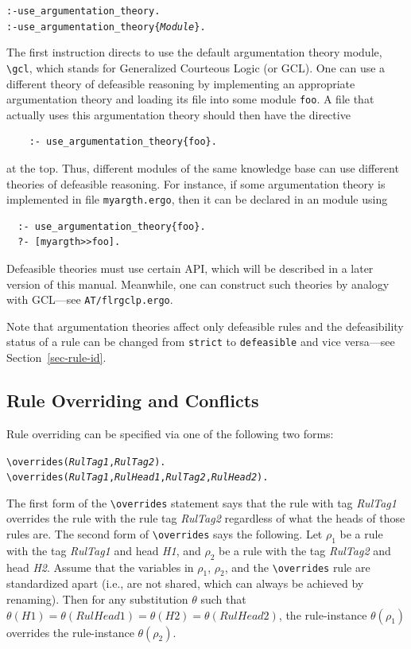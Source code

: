 \documentclass[11pt]{article}
\newcommand{\ERGO}{\mbox{\smaller{\ensuremath{\cal{E}}\smaller{{\sc{RGO}}}}}\xspace}
\newcommand{\FLSYSTEM}{\ERGO}
\newcommand{\ergoext}{ergo\xspace}
\newcommand{\bs}{\textbackslash}
\begin{document}
\begin{alltt}
  :- use_argumentation_theory.
  :- use_argumentation_theory\{\emph{Module}\}.
\end{alltt}
\index{\bs{}gcl module}
The first instruction directs \FLSYSTEM to use the default argumentation theory
module, {\tt \bs{}gcl}, which stands for Generalized Courteous Logic (or GCL).
One can use a different theory of defeasible reasoning by implementing an
appropriate argumentation theory and
loading its file into some module {\tt foo}.
A file that actually uses this argumentation theory should then have
the directive
\begin{verbatim}
    :- use_argumentation_theory{foo}.
\end{verbatim}
at the top. Thus, different modules of the same \FLSYSTEM
knowledge base can use different theories of defeasible reasoning.
For instance, if some argumentation theory is implemented in file
\texttt{myargth.\ergoext}, then it can be declared in an \FLSYSTEM module
using
\begin{verbatim}
  :- use_argumentation_theory{foo}.
  ?- [myargth>>foo].
\end{verbatim}

Defeasible theories must use certain API, which will
be described in a later version of this manual. Meanwhile, one can
construct such theories by analogy with GCL---see {\tt AT/flrgclp.\ergoext}.  

Note that argumentation theories affect only defeasible rules and the
defeasibility status of a rule can be changed from \texttt{strict} to
\texttt{defeasible} and vice versa---see
Section~\ref{sec-rule-id}.

\subsection{Rule Overriding and Conflicts}\label{sec-overriding-conflict}

Rule overriding can be specified via one of the following two forms:
\index{\bs{}overrides predicate}
\begin{alltt}
  \bs{}overrides({\em{}RulTag1},\emph{RulTag2}).
  \bs{}overrides({\em{}RulTag1},{\em{}RulHead1},{\em{}RulTag2},\emph{RulHead2}).
\end{alltt}
The first form of the {\tt \bs{}overrides} statement says that the rule with
tag \emph{RulTag1} overrides the rule with the rule tag
\emph{RulTag2} regardless of what the heads of those rules are. The second
form of {\tt \bs{}overrides} says the following. Let $\rho_1$ be a 
rule with the tag \emph{RulTag1} and head \emph{H1}, and $\rho_2$ be a
rule with the tag \emph{RulTag2} and head \emph{H2}. Assume that
the variables in $\rho_1$, $\rho_2$, and the {\tt \bs{}overrides} rule are
standardized apart (i.e., are not shared, which can always be achieved by
renaming).   Then for any substitution $\theta$ such that $\theta(H1) =
\theta(RulHead1) = \theta(H2) = \theta(RulHead2)$, the rule-instance
$\theta(\rho_1)$ overrides the rule-instance $\theta(\rho_2)$.
\end{document}
